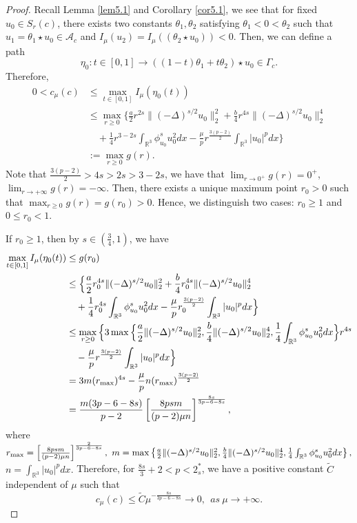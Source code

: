\documentclass[reqno]{amsart}
\begin{document}
\begin{proof} 
Recall Lemma {\ref{lem5.1}} and Corollary {\ref{cor5.1}}, we see that for fixed 
$u_0\in S_{r}(c)$, there exists two constants
$\theta_1, \theta_2$ satisfying $\theta_1<0< \theta_2$ such that 
$u_1=\theta_1 \star u_0 \in \mathcal{A}_c$ and 
$I_\mu(u_2)=I_\mu((\theta_2 \star u_0 ))<0$. Then, we can define a path
$$
\eta_0: t \in [0,1]\to ((1-t)\theta_1+t \theta_2)\star u_0 \in \Gamma_c.
$$
Therefore,
\begin{align*}
0<c_\mu(c)
&\leq  \max_{t\in[0,1]} I_\mu(\eta_0(t))\\
&\leq  \max_{r\geq 0} \Big\{\frac{a}{2}r^{2s}\|(-\Delta)^{s/2}u_0\|^2_2+\frac{b}{4}r^{4s}\|(-\Delta)^{s/2}u_0\|^4_2\\
&\quad +\frac{1}{4}r^{3-2s}\int_{\mathbb{R}^3}\phi^s_{u_0}u^2_0dx
 -\frac{\mu}{p}r^{\frac{3(p-2)}{2}}\int_{\mathbb{R}^3}|u_0|^pdx\Big\}\\
&:=\max_{r\geq 0}g(r).
\end{align*}
Note that $\frac{3(p-2)}{2}>4s>2s>3-2s$, we have that $\lim_{r\to 0^+}g(r)=0^+$, 
$\lim_{r\to +\infty}g(r)=-\infty$. Then, there exists a unique maximum point $r_0>0$ 
such that $\max_{r\geq 0}g(r)=g(r_0)>0$. Hence, we distinguish two cases: $r_0\geq1$ 
and $0 \leq r_0<1$.

If $r_0\geq1$, then by $s\in(\frac{3}{4}, 1)$, we have
\begin{align*}
\max_{t\in[0,1]} I_\mu(\eta_0(t))&\leq  g(r_0)\\
&\leq  \Big\{\frac{a}{2}r^{4s}_0\|(-\Delta)^{s/2}u_0\|^2_2
 +\frac{b}{4}r^{4s}_0\|(-\Delta)^{s/2}u_0\|^4_2\\
&\quad +\frac{1}{4}r^{4s}_0\int_{\mathbb{R}^3}\phi^s_{u_0}u^2_0dx
 -\frac{\mu}{p}r^{\frac{3(p-2)}{2}}_0\int_{\mathbb{R}^3}|u_0|^pdx\Big\}\\
&\leq  \max_{r\geq 0}\Big\{3\max\Big\{\frac{a}{2}\|(-\Delta)^{s/2}u_0\|^2_2, 
 \frac{b}{4}\|(-\Delta)^{s/2}u_0\|^4_2,
 \frac{1}{4}\int_{\mathbb{R}^3}\phi^s_{u_0}u^2_0dx  \Big\}r^{4s}\\
&\quad -\frac{\mu}{p}r^{\frac{3(p-2)}{2}}\int_{\mathbb{R}^3}|u_0|^pdx\Big\}\\
&= 3m(r_{\rm max})^{4s}-\frac{\mu}{p}n(r_{\rm max})^{\frac{3(p-2)}{2}}\\
&= \frac{m(3p-6-8s)}{p-2}\left[\frac{8psm}{(p-2)\mu n}\right]^{\frac{8s}{3p-6-8s}},
\end{align*}
where $r_{\rm max}=\left[\frac{8psm}{(p-2)\mu n}\right]^{\frac{2}{3p-6-8s}}, 
~m=\max\left\{\frac{a}{2}\|(-\Delta)^{s/2}u_0\|^2_2, \frac{b}{4}\|(-\Delta)^{s/2}u_0\|^4_2,
\frac{1}{4}\int_{\mathbb{R}^3}\phi^s_{u_0}u^2_0dx  \right\},$ $n=\int_{\mathbb{R}^3}|u_0|^pdx.$
Therefore, for $\frac{8s}{3}+2<p<2^*_s$, we have a positive constant $\tilde{C}$ independent of $\mu$ such that
$$c_\mu (c)\leq \tilde{C}{\mu}^{-\frac{8s}{3p-6-8s}}\to 0, ~~as~\mu\to +\infty.$$



\end{proof}
\end{document}
